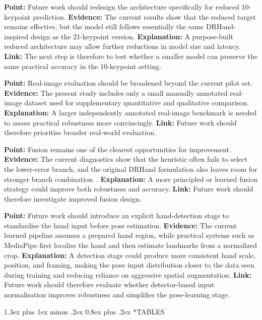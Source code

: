 \documentclass[10pt,letterpaper]{article}
\makeatletter
\renewcommand\section{\@startsection{section}{1}{\z@}%
  {1.3ex plus 1ex minus .2ex}%
  {0.8ex plus .2ex}%
  {\centering\normalfont\small\scshape}}
\makeatother
\begin{document}
\medskip
\noindent\textbf{Point:} Future work should redesign the architecture specifically for reduced 10-keypoint prediction.
\textbf{Evidence:} The current results show that the reduced target remains effective, but the model still follows essentially the same DRHand-inspired design as the 21-keypoint version.
\textbf{Explanation:} A purpose-built reduced architecture may allow further reductions in model size and latency.
\textbf{Link:} The next step is therefore to test whether a smaller model can preserve the same practical accuracy in the 10-keypoint setting.

\medskip
\noindent\textbf{Point:} Real-image evaluation should be broadened beyond the current pilot set.
\textbf{Evidence:} The present study includes only a small manually annotated real-image dataset used for supplementary quantitative and qualitative comparison.
\textbf{Explanation:} A larger independently annotated real-image benchmark is needed to assess practical robustness more convincingly.
\textbf{Link:} Future work should therefore prioritise broader real-world evaluation.

\medskip
\noindent\textbf{Point:} Fusion remains one of the clearest opportunities for improvement.
\textbf{Evidence:} The current diagnostics show that the heuristic often fails to select the lower-error branch, and the original DRHand formulation also leaves room for stronger branch combination~\cite{dualreg}.
\textbf{Explanation:} A more principled or learned fusion strategy could improve both robustness and accuracy.
\textbf{Link:} Future work should therefore investigate improved fusion design.

\medskip
\noindent\textbf{Point:} Future work should introduce an explicit hand-detection stage to standardise the hand input before pose estimation.
\textbf{Evidence:} The current learned pipeline assumes a prepared hand region, while practical systems such as MediaPipe first localise the hand and then estimate landmarks from a normalized crop.
\textbf{Explanation:} A detection stage could produce more consistent hand scale, position, and framing, making the pose input distribution closer to the data seen during training and reducing reliance on aggressive spatial augmentation.
\textbf{Link:} Future work should therefore evaluate whether detector-based input normalisation improves robustness and simplifies the pose-learning stage.

\clearpage
\onecolumn
\section*{TABLES}
\end{document}
